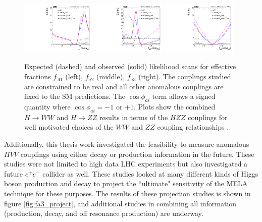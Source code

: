 \begin{figure}
  \centering
      \includegraphics[width=0.32\textwidth]{Conclusion/flambda1_combine_ww.pdf}
      \includegraphics[width=0.32\textwidth]{Conclusion/fa2_combine_ww.pdf}
       \includegraphics[width=0.32\textwidth]{Conclusion/fa3_combine_ww.pdf}
         \caption[Expected (dashed) and observed (solid) likelihood scans for effective fractions
	$f_{\Lambda1}$ (left), $f_{a2}$ (middle), $f_{a3}$ (right).
	The couplings studied are constrained to be real and all other anomalous couplings are fixed to the SM predictions.
	The $\cos\phi_{ai}$ term allows a signed quantity where $\cos\phi_{ai}=-1$ or $+1$.
	Plots show the combined  $H \to WW$ and $H \to ZZ$ results in terms of the $HZZ$ couplings for well motivated choices of the $WW$ and $ZZ$ coupling relationships.]{
         Expected (dashed) and observed (solid) likelihood scans for effective fractions
	$f_{\Lambda1}$ (left), $f_{a2}$ (middle), $f_{a3}$ (right).
	The couplings studied are constrained to be real and all other anomalous couplings are fixed to the SM predictions.
	The $\cos\phi_{ai}$ term allows a signed quantity where $\cos\phi_{ai}=-1$ or $+1$.
	Plots show the combined  $H \to WW$ and $H \to ZZ$ results in terms of the $HZZ$ couplings for well motivated choices of the $WW$ and $ZZ$ coupling relationships \cite{Khachatryan:2014kca}.
	}
    \label{fig:hwwscans}

\end{figure}

Additionally, this thesis work investigated the feasibility to measure anomalous $HVV$ couplings using either decay or production information in the future. These studies were not limited to high data LHC experiments but also investigated a future $e^{+}e^{-}$ collider as well. These studies looked at many different kinds of Higgs boson production and decay to project the ``ultimate" sensitivity of the MELA technique for these purposes. The results of these projection studies is shown in figure \ref{fig:fa3_project}, and additional studies in combining all information (production, decay, and off resonance production) are underway. 

